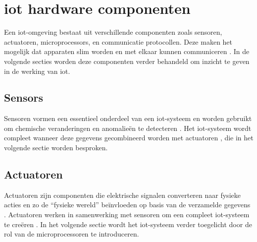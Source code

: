 


\section{\gls{iot} hardware componenten} 
Een \gls{iot}-omgeving bestaat uit verschillende componenten zoals sensoren, actuatoren, microprocessors, en communicatie protocollen. Deze maken het mogelijk dat apparaten slim worden en met elkaar kunnen communiceren \autocite{Abraham2023, Gharde2024}. In de volgende secties worden deze componenten verder behandeld om inzicht te geven in de werking van \gls{iot}.

\subsection{Sensors}
Sensoren vormen een essentieel onderdeel van een \gls{iot}-systeem en worden gebruikt om chemische veranderingen en anomalieën te detecteren \autocite{Abraham2023, Moyer2019, Sehrawat2019}. Het \gls{iot}-systeem wordt compleet wanneer deze gegevens gecombineerd worden met actuatoren \autocite{Moyer2019}, die in het volgende sectie worden besproken. 

\subsection{Actuatoren}
Actuatoren zijn componenten die elektrische signalen converteren naar fysieke acties en zo de “fysieke wereld” beïnvloeden op basis van de verzamelde gegevens \autocite{Zhang2022}. Actuatoren werken in samenwerking met sensoren om een compleet \gls{iot}-systeem te creëren \autocite{Moyer2019}. In het volgende sectie wordt het \gls{iot}-systeem verder toegelicht door de rol van de microprocessoren te introduceren.

